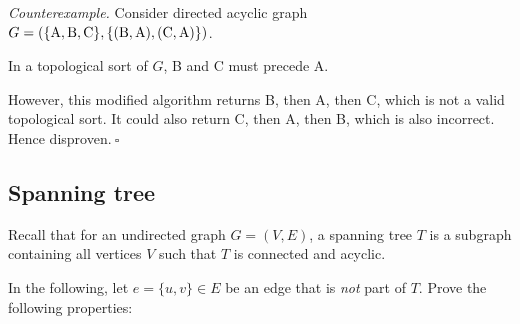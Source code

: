 \begin{enumerate}
\begin{solution}
\textit{Counterexample. }
Consider directed acyclic graph $G=(\{{\rm A},{\rm B},{\rm C}\},\{({\rm B},{\rm A}),({\rm C},{\rm A})\})$.

In a topological sort of $G$, B and C must precede A.

However, this modified algorithm returns B, then A, then C, which is not a valid topological sort. It could also return C, then A, then B, which is also incorrect. Hence disproven.$~\square$
\end{solution}
\end{enumerate}
\newpage
\subsection{Spanning tree}

Recall that for an undirected graph $G = (V,E)$, a spanning tree $T$ is a subgraph containing all vertices $V$ such that $T$ is connected and acyclic. 

In the following, let $e=\{u,v\}\in E$ be an edge that is \emph{not} part of $T$.
Prove the following properties:

